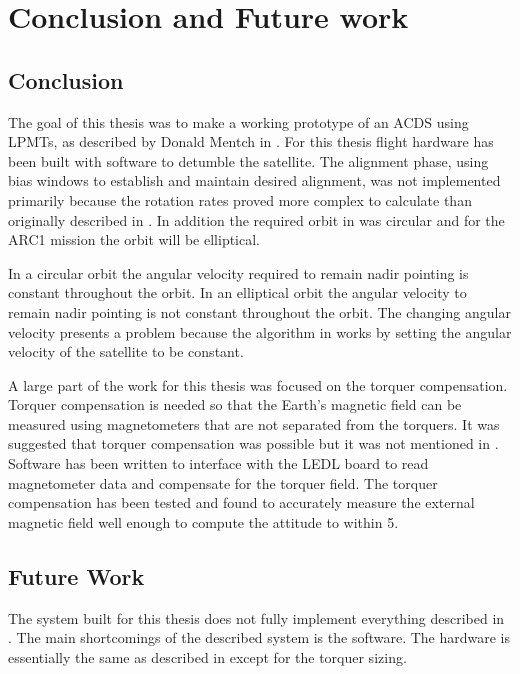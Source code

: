 
\chapter{Conclusion and Future work}

\section{Conclusion}

The goal of this thesis was to make a working prototype of an \ac{ACDS} using \acp{LPMT}, as described by Donald Mentch in \cite{Mentch11}. For this thesis flight hardware has been built with software to detumble the satellite. The alignment phase, using bias windows to establish and maintain desired alignment, was not implemented primarily because the rotation rates proved more complex to calculate than originally described in \cite{Mentch11}. In addition the required orbit in \cite{Mentch11} was circular and for the \ac{ARC}1 mission the orbit will be elliptical.

In a circular orbit the angular velocity required to remain nadir pointing is constant throughout the orbit. In an elliptical orbit the angular velocity to remain nadir pointing is not constant throughout the orbit. The changing angular velocity presents a problem because the algorithm in \cite{Mentch11} works by setting the angular velocity of the satellite to be constant. 

A large part of the work for this thesis was focused on the torquer compensation. Torquer compensation is needed so that the Earth's magnetic field can be measured using magnetometers that are not separated from the torquers. It was suggested that torquer compensation was possible but it was not mentioned in \cite{Mentch11}. Software has been written to interface with the \ac{LEDL} board to read magnetometer data and compensate for the torquer field. The torquer compensation has been tested and found to accurately measure the external magnetic field well enough to compute the attitude to within \textpm{}5\textdegree.

\section{Future Work}

\label{sec:future-work}

The system built for this thesis does not fully implement everything described in \cite{Mentch11}. The main shortcomings of the described system is the software. The hardware is essentially the same as described in \cite{Mentch11} except for the torquer sizing.


